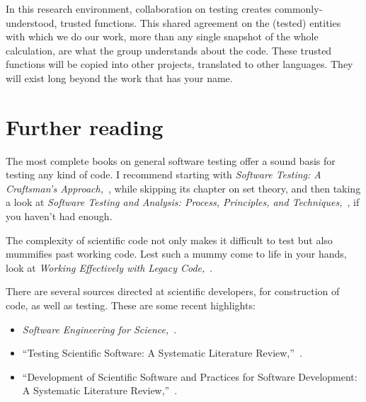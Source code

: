 \documentclass[fleqn,10pt]{olplainarticle}
\begin{document}
In this research environment, collaboration on testing
creates commonly-understood, trusted functions. This shared
agreement on the (tested) entities with which we do our work, more
than any single snapshot of the whole calculation, are
what the group understands about the code. These trusted
functions will be copied into other projects, translated
to other languages. They will exist long beyond the work
that has your name.

\section{Further reading}\label{sec:further-reading}

The most complete books on general software testing offer a sound
basis for testing any kind of code. I recommend starting with
\emph{Software Testing: A Craftsman's Approach,}~\citep{jorgensen2013},
while skipping its chapter on set theory, and then taking a look at
\emph{Software Testing and Analysis: Process, Principles, and Techniques,}~\citep{pezze2008},
if you haven't had enough.

The complexity of scientific code not only makes it difficult
to test but also mummifies past working code. Lest such a mummy
come to life in your hands, look at \emph{Working Effectively with Legacy Code,}~\citep{feathers2004working}.

There are several sources directed at scientific developers, for
construction of code, as well as testing. These are some recent highlights:
\begin{itemize}
	\item \emph{Software Engineering for Science,}~\cite{carver2017}.
	\item ``Testing Scientific Software: A Systematic Literature Review,''~\cite{kanewala2014}.
	\item ``Development of Scientific Software and Practices for Software Development: A Systematic Literature Review,''~\cite{neumann2016}.
\end{itemize}




\printindex
\end{document}

